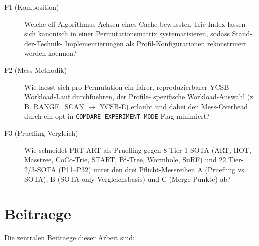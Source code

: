 \begin{description}
    \item[F1 (Komposition)] Welche elf Algorithmus-Achsen eines
          Cache-bewussten Trie-Index lassen sich kanonisch in einer
          Permutationsmatrix systematisieren, sodass Stand-der-Technik-
          Implementierungen als Profil-Konfigurationen rekonstruiert
          werden koennen?

    \item[F2 (Mess-Methodik)] Wie laesst sich pro Permutation ein fairer,
          reproduzierbarer YCSB-Workload-Lauf durchfuehren, der Profile-
          spezifische Workload-Auswahl (z.\,B. RANGE\_SCAN $\to$ YCSB-E)
          erlaubt und dabei den Mess-Overhead durch ein opt-in
          \texttt{COMDARE\_EXPERIMENT\_MODE}-Flag minimiert?

    \item[F3 (Pruefling-Vergleich)] Wie schneidet PRT-ART als Pruefling
          gegen 8 Tier-1-SOTA (ART, HOT, Masstree, CoCo-Trie, START,
          B$^2$-Tree, Wormhole, SuRF) und 22 Tier-2/3-SOTA (P11--P32)
          unter den drei Pflicht-Messreihen A (Pruefling vs. SOTA),
          B (SOTA-only Vergleichsbasis) und C (Merge-Punkte) ab?
\end{description}

\section{Beitraege}

Die zentralen Beitraege dieser Arbeit sind:

